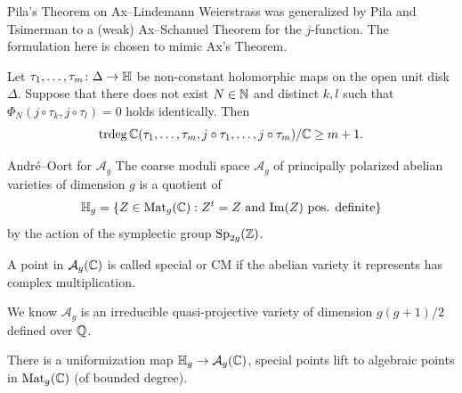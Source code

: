 \documentclass{beamer}
\begin{document}
\begin{frame}
  Pila's Theorem on Ax--Lindemann Weierstrass
  was generalized by Pila and Tsimerman to a (weak) Ax--Schanuel
  Theorem for the $j$-function. The formulation here is chosen to
  mimic Ax's Theorem.

  \begin{theorem}
    Let $\tau_1,\ldots,\tau_m\colon\Delta\rightarrow{\mathbb{H}}$ be
    non-constant holomorphic maps on the open unit disk $\Delta$.
    Suppose that there does not exist $N\in{\mathbb{N}}$ and distinct $k,l$
    such that $\Phi_N(j\circ\tau_k,j\circ \tau_l)=0$ holds
    identically. Then
    \begin{equation*}
      \mathrm{trdeg}\,{\mathbb{C}}(\tau_1,\ldots,\tau_m,j\circ\tau_1,\ldots,j\circ\tau_m)/{\mathbb{C}}
      \ge m+1.
    \end{equation*}
  \end{theorem}   
\end{frame}

\begin{frame}{Andr\'e--Oort for $\mathcal{A}_g$}
  The coarse moduli space $\mathcal{A}_g$ of principally polarized abelian varieties
  of dimension $g$ is a quotient of
  \begin{equation*}
    {\mathbb{H}}_g = \{Z\in \mathrm{Mat}_{g}({{\mathbb{C}}}) : Z^t = Z \text{ and }
    \mathrm{Im}(Z) \text{ pos. definite}\}
  \end{equation*}
  by the action of the symplectic group $\mathrm{Sp}_{2g}({\mathbb{Z}})$.
  
  \begin{definition}
    A point in $\mathcal{A}_g({\mathbb{C}})$ is called \alert{special} or
    \alert{CM}
    if the abelian
    variety  it represents has complex
    multiplication. 
  \end{definition}

  We know $\mathcal{A}_g$ is an irreducible quasi-projective variety of
  dimension $g(g+1)/2$ defined over ${\mathbb{Q}}$.
  
  There is a uniformization map
    ${\mathbb{H}}_g \rightarrow \mathcal{A}_g({\mathbb{C}})$,
  special points lift to algebraic points in $\mathrm{Mat}_{g}({{\mathbb{C}}})$ (of
  bounded degree).
\end{frame}
\end{document}
